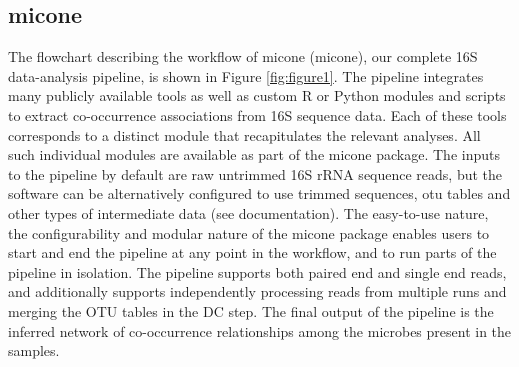   \subsection*{\ac{micone}}
  \vspace{-5mm}
  The flowchart describing the workflow of \ac{micone} (\acl{micone}), our complete 16S data-analysis pipeline, is shown in Figure \ref{fig:figure1}.
  The pipeline integrates many publicly available tools as well as custom R or Python modules and scripts to extract co-occurrence associations from 16S sequence data.
  Each of these tools corresponds to a distinct module that recapitulates the relevant analyses.
  All such individual modules are available as part of the \ac{micone} package.
  The inputs to the pipeline by default are raw untrimmed 16S rRNA sequence reads, but the software can be alternatively configured to use trimmed sequences, \ac{otu} tables and other types of intermediate data (see documentation).
  The easy-to-use nature, the configurability and modular nature of the \ac{micone} package enables users to start and end the pipeline at any point in the workflow, and to run parts of the pipeline in isolation.
  The pipeline supports both paired end and single end reads, and additionally supports independently processing reads from multiple runs and merging the OTU tables in the DC step.
  The final output of the pipeline is the inferred network of co-occurrence relationships among the microbes present in the samples.

